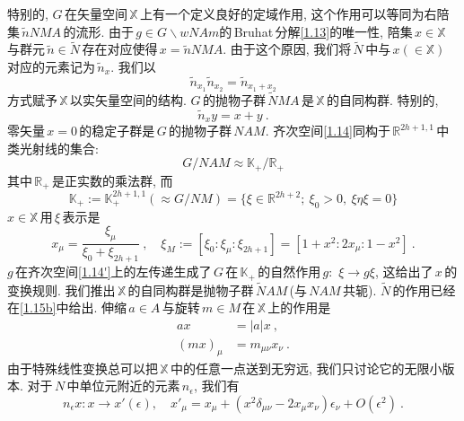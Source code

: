 特别的, $G\,$在矢量空间$\,\mathbb{X}\,$上有一个定义良好的定域作用, 这个作用可以等同为右陪集$\,\tilde{n}NMA\,$的流形. 
由于$\,g\in G\backslash wNAm$的\,Bruhat\,分解\eqref{1.13}的唯一性, 陪集$\,x\in\mathbb{X}\,$与群元$\,\tilde{n}\in\tilde{N}\,$存在对应使得$\,x=\tilde{n}NMA$. 由于这个原因, 我们将$\,\tilde{N}\,$中与$\,x(\in\mathbb{X})\,$对应的元素记为$\,\tilde{n}_{x}$. 我们以
\begin{equation}
    \tilde{n}_{x_{1}}\tilde{n}_{x_{2}}=\tilde{n}_{x_{1}+x_{2}} \tag{1.15a}\label{1.15a}
\end{equation}
方式赋予$\,\mathbb{X}\,$以实矢量空间的结构. $G\,$的抛物子群$\,\tilde{N}MA\,$是$\,\mathbb{X}\,$的自同构群. 特别的, 
\begin{equation}
    \tilde{n}_{x}y=x+y \:. \tag{1.15b} \label{1.15b}
\end{equation}
零矢量$\,x=0\,$的稳定子群是$\,G\,$的抛物子群$\,NAM$. 齐次空间\eqref{1.14}同构于$\,\mathbb{R}^{2h+1,1}\,$中类光射线的集合:
\begin{equation*}
    G/NAM\approx \mathbb{K}_{+}/\mathbb{R}_{+} \tag{1.14$'$} \label{1.14'}
\end{equation*}
其中$\,\mathbb{R}_{+}\,$是正实数的乘法群, 而
\begin{equation*}
    \mathbb{K}_{+}:= \mathbb{K}^{2h+1,1}_{+}(\approx G/NM) = 
    \{ \xi\in \mathbb{R}^{2h+2};\:\xi_{0}>0,\:\xi\eta\xi=0\}
\end{equation*}
$x\in \mathbb{X}\,$用$\,\xi\,$表示是
\begin{equation}
    x_{\mu}=\frac{\xi_{\mu}}{\xi_{0}+\xi_{2h+1}} \:, \quad 
    \xi_{M}:=[\xi_{0}:\xi_{\mu}:\xi_{2h+1}]=[1+x^{2}:2x_{\mu}:1-x^{2}]\:. \tag{1.16}\label{1.16}
\end{equation}
\setcounter{equation}{16}
$g\,$在齐次空间\eqref{1.14'}上的左传递生成了$\,G\,$在$\,\mathbb{K}_{+}\,$的自然作用$\,g:$ $\xi\to g\xi$, 这给出了$\,x\,$的变换规则. 我们推出$\,\mathbb{X}\,$的自同构群是抛物子群$\,\tilde{N}AM\,$(与$\,NAM\,$共轭). $\tilde{N}\,$的作用已经在\eqref{1.15b}中给出. 伸缩$\,a\in A$\,与旋转$\,m\in M\,$在$\,\mathbb{X}\,$上的作用是
    \begin{subequations}\label{1.17}
        \begin{align}
            ax&=\lvert a\rvert x \:, \\
        (mx)_{\mu}&= m_{\mu\nu}x_{\nu} \:.
        \end{align}
    \end{subequations}
由于特殊线性变换总可以把$\,\mathbb{X}\,$中的任意一点送到无穷远, 我们只讨论它的无限小版本. 对于$\,N\,$中单位元附近的元素$\,n_{\epsilon}$, 我们有
\begin{equation}
    n_{\epsilon}x : x\to x'(\epsilon),\quad 
     x'_{\mu}=x_{\mu}+(x^{2}\delta_{\mu\nu}-2x_{\mu}x_{\nu})\epsilon_{\nu}+O(\epsilon^{2}) \:. \label{1.18}
\end{equation}

